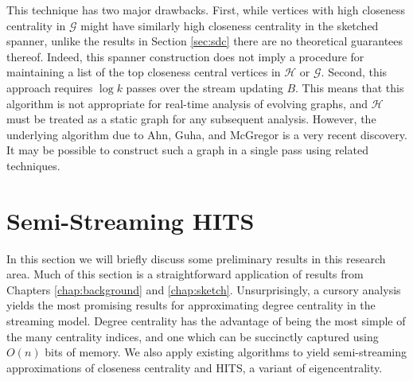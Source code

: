 \documentclass{report}
\begin{document}
This technique has two major drawbacks. 
First, while vertices with high closeness centrality in $\mathcal{G}$  might have similarly high closeness centrality in the sketched spanner, unlike the results in Section \ref{sec:sdc} there are no theoretical guarantees thereof. 
Indeed, this spanner construction does not imply a procedure for maintaining a list of the top closeness central vertices in $\mathcal{H}$ or $\mathcal{G}$. 
Second, this approach requires $\log k$ passes over the stream updating $B$. 
This means that this algorithm is not appropriate for real-time analysis of evolving graphs, and $\mathcal{H}$ must be treated as a static graph for any subsequent analysis. 
However, the underlying algorithm due to Ahn, Guha, and McGregor is a very recent discovery. 
It may be possible to construct such a graph in a single pass using related techniques. 





\chapter{Semi-Streaming HITS} \label{chap:hits}

In this section we will briefly discuss some preliminary results in this research area. 
Much of this section is a straightforward application of results from Chapters \ref{chap:background} and \ref{chap:sketch}.
Unsurprisingly, a cursory analysis yields the most promising results for approximating degree centrality in the streaming model. 
Degree centrality has the advantage of being the most simple of the many centrality indices, and one which can be succinctly captured using $O(n)$ bits of memory. 
We also apply existing algorithms to yield semi-streaming approximations of closeness centrality and HITS, a variant of eigencentrality. 
\end{document}
